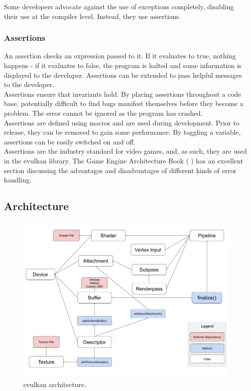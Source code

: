 \documentclass[12pt]{report}
\newcommand{\citebu}[1]{(\citenoparen{#1})}
\newcommand{\citenoparen}[1]{\citeauthor{#1} \citeyear{#1}}
\theoremstyle{definition}
\begin{document}
          Some developers advocate against the use of exceptions completely,
          disabling their use at the compiler level. Instead, they use
          assertions.

        \subsubsection{Assertions}

          An assertion checks an expression passed to it. If it evaluates to
          true, nothing happens - if it evaluates to false, the program is
          halted and some information is displayed to the developer.
          Assertions can be extended to pass helpful messages to the
          developer. \\

          Assertions ensure that invariants hold. By placing assertions
          throughout a code base, potentially difficult to find bugs manifest
          themselves before they become a problem. The error cannot be ignored
          as the program has crashed. \\

          Assertions are defined using macros and are used during development.
          Prior to release, they can be removed to gain some performance. By
          toggling a variable, assertions can be easily switched on and off. \\

          Assertions are the industry standard for video games, and, as such,
          they are used in the evulkan library. The Game Engine Architecture Book \citebu{gameEngineBook}
          has an excellent section discussing the advantages and disadvantages of
          different kinds of error handling.

      \subsection{Architecture}

        \begin{figure}[h]
          \centering
          \includegraphics[width=\textwidth]{images/evk_architecture.png}
          \caption{evulkan architecture.}
          \label{fig:evulkan_architecture}  
        \end{figure}
\end{document}
